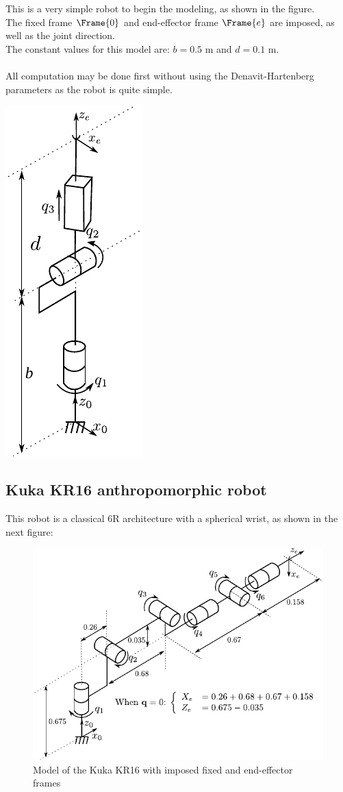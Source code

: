 \documentclass{ecnreport}
\begin{document}
\begin{minipage}{.8\linewidth}
	This is a very simple robot to begin the modeling, as shown in the figure.\\
	The fixed frame $\Frame{0}$ and end-effector frame $\Frame{e}$ are imposed, as well as the joint direction.\\
	The constant values for this model are: $b = 0.5$ m and $d = 0.1$ m.\\~\\
	All computation may be done first without using the Denavit-Hartenberg parameters as the robot is quite simple. 
\end{minipage}
\begin{minipage}{.2\linewidth}
	\includegraphics{fig/turret}\label{turret}
\end{minipage}

\subsection{Kuka KR16 anthropomorphic robot}

This robot is a classical 6R architecture with a spherical wrist, as shown in the next figure:

\begin{figure}[h!]\centering
	\includegraphics[width=.6\linewidth]{fig/kr16}
	\caption{Model of the Kuka KR16 with imposed fixed and end-effector frames}
\end{figure}
\end{document}
